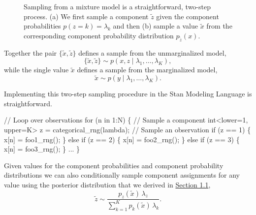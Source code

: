 \documentclass[
  letterpaper,
  DIV=11,
  numbers=noendperiod]{scrartcl}
\newenvironment{Shaded}{\begin{snugshade}}{\end{snugshade}}
\newcommand{\CommentTok}[1]{\textcolor[rgb]{0.37,0.37,0.37}{#1}}
\newcommand{\ControlFlowTok}[1]{\textcolor[rgb]{0.00,0.23,0.31}{#1}}
\newcommand{\DataTypeTok}[1]{\textcolor[rgb]{0.68,0.00,0.00}{#1}}
\newcommand{\DecValTok}[1]{\textcolor[rgb]{0.68,0.00,0.00}{#1}}
\newcommand{\KeywordTok}[1]{\textcolor[rgb]{0.00,0.23,0.31}{#1}}
\newcommand{\NormalTok}[1]{\textcolor[rgb]{0.00,0.23,0.31}{#1}}
\begin{document}
\begin{figure}
\begin{minipage}{0.45\linewidth}
{}

\subcaption{\label{fig-sampling-two}}

\end{minipage}%

\caption{\label{fig-sampling}Sampling from a mixture model is a
straightforward, two-step process. (a) We first sample a component
\(\tilde{z}\) given the component probabilities
\(p(z = k) = \lambda_{k}\) and then (b) sample a value \(\tilde{x}\)
from the corresponding component probability distribution
\(p_{\tilde{z}}(x)\).}

\end{figure}%

Together the pair \(\{ \tilde{x}, \tilde{z} \}\) defines a sample from
the unmarginalized model, \[
\{ \tilde{x}, \tilde{z} \}
\sim
p(x, z \mid \lambda_{1}, \ldots, \lambda_{K}),
\] while the single value \(\tilde{x}\) defines a sample from the
marginalized model, \[
\tilde{x} \sim p(y \mid \lambda_{1}, \ldots, \lambda_{K}).
\]

Implementing this two-step sampling procedure in the Stan Modeling
Language is straightforward.

\begin{Shaded}
\begin{Highlighting}[]
\CommentTok{// Loop over observations}
\ControlFlowTok{for}\NormalTok{ (n }\ControlFlowTok{in} \DecValTok{1}\NormalTok{:N) \{}
  \CommentTok{// Sample a component}
  \DataTypeTok{int}\NormalTok{\textless{}}\KeywordTok{lower}\NormalTok{=}\DecValTok{1}\NormalTok{, }\KeywordTok{upper}\NormalTok{=K\textgreater{} z = categorical\_rng(lambda);}
  \CommentTok{// Sample an observation}
  \ControlFlowTok{if}\NormalTok{ (z == }\DecValTok{1}\NormalTok{) \{}
\NormalTok{    x[n] = foo1\_rng();}
\NormalTok{  \} }\ControlFlowTok{else} \ControlFlowTok{if}\NormalTok{ (z == }\DecValTok{2}\NormalTok{) \{}
\NormalTok{    x[n] = foo2\_rng();}
\NormalTok{  \} }\ControlFlowTok{else} \ControlFlowTok{if}\NormalTok{ (z == }\DecValTok{3}\NormalTok{) \{}
\NormalTok{    x[n] = foo3\_rng();}
\NormalTok{  \} ...}
\NormalTok{\}}
\end{Highlighting}
\end{Shaded}

Given values for the component probabilities and component probability
distributions we can also conditionally sample component assignments for
any value using the posterior distribution that we derived in
\hyperref[sec:cat_impl]{Section 1.1}, \[
\tilde{z}
\sim
\frac{ p_{z}(\tilde{x}) \, \lambda_{z} }
{ \sum_{k = 1}^{K} p_{k}(\tilde{x}) \, \lambda_{k} }.
\]
\end{document}
